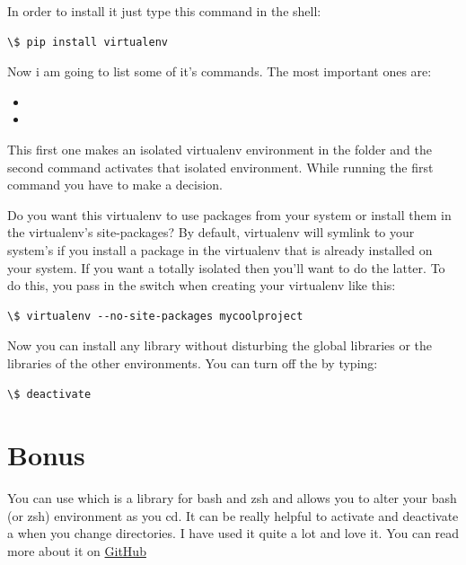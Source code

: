 \documentclass[a4paper,12pt,oneside]{sphinxmanual}
\begin{document}
In order to install it just type this command in the shell:
\begin{Verbatim}[commandchars=\\\{\}]
\$ pip install virtualenv
\end{Verbatim}

Now i am going to list some of it's commands. The most important ones
are:
\begin{itemize}
\item {} 

\item {} 

\end{itemize}

This first one makes an isolated virtualenv environment in the
 folder and the second command activates that isolated
environment. While running the first command you have to make a
decision.

Do you want this virtualenv to use packages from your system
 or install them in the virtualenv’s site-packages? By
default, virtualenv will symlink to your system’s  if
you install a package in the virtualenv that is already installed on
your system. If you want a totally isolated  then you’ll
want to do the latter. To do this, you pass in the
 switch when creating your virtualenv like this:
\begin{Verbatim}[commandchars=\\\{\}]
\$ virtualenv --no-site-packages mycoolproject
\end{Verbatim}

Now you can install any library without disturbing the global libraries
or the libraries of the other environments. You can turn off the 
by typing:
\begin{Verbatim}[commandchars=\\\{\}]
\$ deactivate
\end{Verbatim}


\section{Bonus}
\label{virtual_environment:bonus}
You can use  which is a library for bash and zsh and allows
you to alter your bash (or zsh) environment as you cd. It can be really
helpful to activate and deactivate a  when you change
directories. I have used it quite a lot and love it. You can read more
about it on \href{https://github.com/cxreg/smartcd}{GitHub}
\end{document}
